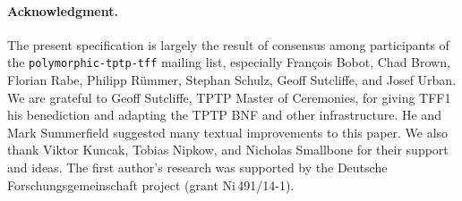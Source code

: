 \def\ackname{Acknowledgment}
\paragraph{\textbf{\upshape\ackname.}}
%
The present specification is largely the result of consensus among
participants of the {\tt polymorphic-tptp-tff} mailing list, especially
Fran\c{c}ois Bobot, Chad Brown, Florian Rabe, Philipp R\"ummer, Stephan Schulz,
Geoff Sutcliffe, and Josef Urban.
We are grateful to Geoff Sutcliffe, TPTP Master of Ceremonies, for giving TFF1
his benediction and adapting the TPTP BNF and other infrastructure.
He and Mark Summerfield suggested many textual improvements to this paper.
We also thank Viktor Kuncak, Tobias Nipkow, and Nicholas Smallbone for their
support and ideas.
%
The first author's research was supported by the Deutsche
Forschungs\-gemein\-schaft project  (grant
Ni\,491\slash 14-1).
%
